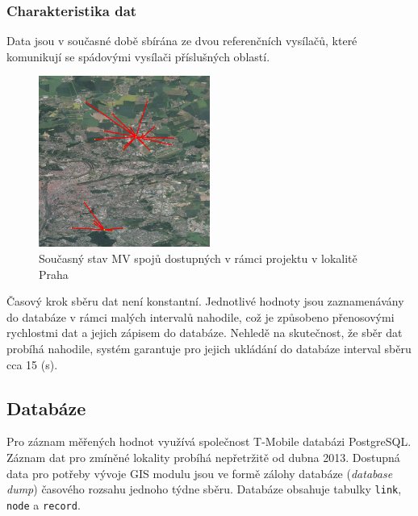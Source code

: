 \documentclass[a4paper,12pt,oneside]{report}
\begin{document}
\subsubsection*{Charakteristika dat} Data jsou v současné době
sbírána ze dvou referenčních vysílačů, které komunikují se spádovými
vysílači příslušných oblastí.

\begin{figure}[h!]
    \centering
    \includegraphics[width=0.5\textwidth]{./img/letnany.png}
    \caption[Snapshot model]{Současný stav MV spojů dostupných v rámci projektu v lokalitě Praha  \centering  }
        \label{fig:snapshot}
 \end{figure} 
 Časový krok sběru dat není konstantní. Jednotlivé hodnoty jsou
 zaznamenávány do databáze v rámci malých intervalů nahodile, což je způsobeno přenosovými rychlostmi dat a jejich  zápisem do databáze. Nehledě na skutečnost, že sběr dat probíhá  nahodile, systém garantuje pro jejich ukládání do databáze interval sběru 
 cca 15 (s).




\subsection*{Databáze}  
Pro záznam měřených hodnot využívá společnost T-Mobile databázi
PostgreSQL. Záznam dat pro zmíněné lokality probíhá nepřetržitě od
dubna 2013. Dostupná data pro potřeby vývoje GIS modulu jsou ve formě
zálohy databáze (\textit{database dump}) časového rozsahu jednoho
týdne sběru. Databáze obsahuje tabulky \texttt{link}, \texttt{node} a
\texttt{record}.
 
\end{document}
